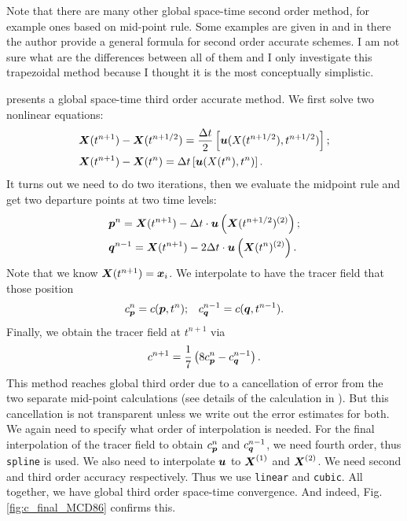 \documentclass[11pt,letterpaper]{article}
\begin{document}
Note that there are many other global space-time second order method, for example ones based on mid-point rule. Some examples are given in \cite{mcdonald1999} and in there the author provide a general formula for second order accurate schemes. I am not sure what are the differences between all of them and I only investigate this trapezoidal method because I thought it is the most conceptually simplistic. 

\cite{mcdonald1987} presents a global space-time third order accurate method. We first solve two nonlinear equations:
\begin{align*}
    &\boldsymbol{X}(t^{n+1})-\boldsymbol{X}(t^{n+1/2}) = \frac{\Delta t}{2}\left[\boldsymbol{u}(X(t^{n+1/2}),t^{n+1/2})\right];\\
    &\boldsymbol{X}(t^{n+1})-\boldsymbol{X}(t^{n}) = {\Delta t}\left[\boldsymbol{u}(X(t^{n}),t^{n})\right].
\end{align*}
It turns out we need to do two iterations, then we evaluate the midpoint rule and get two departure points at two time levels:
\begin{align*}
    &\boldsymbol{p}^{n} = \boldsymbol{X}(t^{n+1})-\Delta t\cdot \boldsymbol{u}\left(\boldsymbol{X}(t^{n+1/2})^{(2)}\right);\\
    &\boldsymbol{q}^{n-1} = \boldsymbol{X}(t^{n+1})-2\Delta t\cdot \boldsymbol{u}\left(\boldsymbol{X}(t^{n})^{(2)}\right).
\end{align*}
Note that we know $\boldsymbol{X}(t^{n+1}) = \boldsymbol{x}_i$. We interpolate to have the tracer field that those position
\begin{align*}
    &c_{\boldsymbol{p}}^n = c(\boldsymbol{p},t^n);
    &c_{\boldsymbol{q}}^{n-1} = c(\boldsymbol{q},t^{n-1}).
\end{align*}
Finally, we obtain the tracer field at $t^{n+1}$ via
\begin{align*}
    c^{n+1} = \frac{1}{7}\left(8c_{\boldsymbol{p}}^n-c_{\boldsymbol{q}}^{n-1}\right). 
\end{align*}
This method reaches global third order due to a cancellation of error from the two separate mid-point calculations (see details of the calculation in \cite{mcdonald1987}). But this cancellation is not transparent unless we write out the error estimates for both. We again need to specify what order of interpolation is needed. For the final interpolation of the tracer field to obtain $c_{\boldsymbol{p}}^n$ and $c_{\boldsymbol{q}}^{n-1}$, we need fourth order, thus \texttt{spline} is used. We also need to interpolate $\boldsymbol{u}$ to $\boldsymbol{X}^{(1)}$ and $\boldsymbol{X}^{(2)}$. We need second and third order accuracy respectively. Thus we use \texttt{linear} and \texttt{cubic}. All together, we have global third order space-time convergence. And indeed, Fig. \ref{fig:c_final_MCD86} confirms this.
\end{document}
